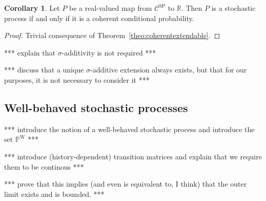 \documentclass[10pt]{paper}
\theoremstyle{definition}
\newtheorem{corollary}[theorem]{Corollary}
\newcommand{\reals}{\mathbb{R}}
\newcommand{\states}{\mathcal{X}}
\newcommand{\processes}{\mathbb{P}}
\newcommand{\wprocesses}{\processes^{\mathrm{W}}}
\newcommand{\gambles}{\mathcal{L}}
\newcommand{\gamblesX}{\gambles(\states)}
\begin{document}
\begin{corollary}
Let $P$ be a real-valued map from $\mathcal{C}^\mathrm{SP}$ to $\reals$. Then $P$ is a stochastic process if and only if it is a coherent conditional probability.
\end{corollary}
\begin{proof}
Trivial consequence of Theorem~\ref{theo:coherentextendable}.
\end{proof}

*** explain that $\sigma$-additivity is not required ***

*** discuss that a unique $\sigma$-additive extension always exists, but that for our purposes, it is not necessary to consider it ***

\subsection{Well-behaved stochastic processes}

*** introduce the notion of a well-behaved stochastic process and introduce the set $\wprocesses$ ***

*** introduce (history-dependent) transition matrices and explain that we require them to be continous ***

*** prove that this implies (and even is equivalent to, I think) that the outer limit exists and is bounded. ***



\end{document}
